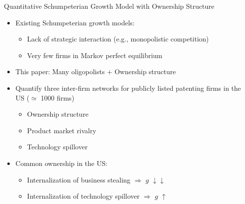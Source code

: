 \documentclass[
  10pt, %
  aspectratio=169,  %
  handout
]{beamer}
\theoremstyle{plain}
\begin{document}
\begin{frame}{Quantitative Schumpeterian Growth Model with Ownership Structure}
  \begin{itemize}
    \item Existing Schumpeterian growth models:
    \begin{itemize}
      \item Lack of strategic interaction (e.g., monopolistic competition)
      \item Very few firms in Markov perfect equilibrium
    \end{itemize}
    \medskip{}
    \item This paper: Many oligopolists $+$ Ownership structure
    \medskip{}\pause
    \item Quantify three inter-firm networks for publicly listed patenting firms in the US ($\simeq$ 1000 firms)
    \begin{itemize}
      \item Ownership structure
      \item Product market rivalry
      \item Technology spillover
    \end{itemize}
    \medskip{}\pause
    \item Common ownership in the US:
    \begin{itemize}
      \item Internalization of business stealing $\Longrightarrow$ $g$ $\downarrow \downarrow$
      \item Internalization of technology spillover $\Longrightarrow$ $g$ $\uparrow$
    \end{itemize}
  \end{itemize}
\end{frame}
\end{document}
